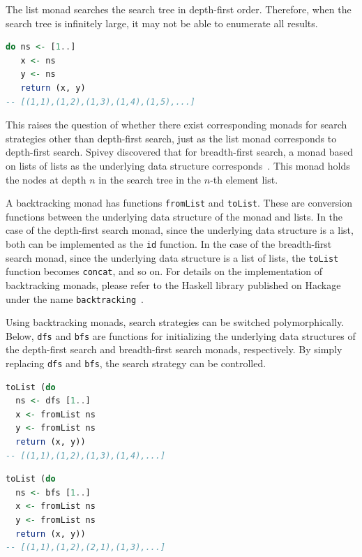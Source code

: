 The list monad searches the search tree in depth-first order.
Therefore, when the search tree is infinitely large, it may not be able to enumerate all results.
\begin{lstlisting}[language=haskell,numbers=none]
do ns <- [1..]
   x <- ns
   y <- ns
   return (x, y)
-- [(1,1),(1,2),(1,3),(1,4),(1,5),...]
\end{lstlisting}

This raises the question of whether there exist corresponding monads for search strategies other than depth-first search, just as the list monad corresponds to depth-first search.
Spivey discovered that for breadth-first search, a monad based on lists of lists as the underlying data structure corresponds~\cite{spivey2009algebras}.
This monad holds the nodes at depth $n$ in the search tree in the $n$-th element list.

A backtracking monad has functions \lstinline{fromList} and \lstinline{toList}.
These are conversion functions between the underlying data structure of the monad and lists.
In the case of the depth-first search monad, since the underlying data structure is a list, both can be implemented as the \lstinline{id} function.
In the case of the breadth-first search monad, since the underlying data structure is a list of lists, the \lstinline{toList} function becomes \lstinline{concat}, and so on.
For details on the implementation of backtracking monads, please refer to the Haskell library published on Hackage under the name \texttt{backtracking}~\cite{backtrackingGitHub}.

Using backtracking monads, search strategies can be switched polymorphically.
Below, \lstinline{dfs} and \lstinline{bfs} are functions for initializing the underlying data structures of the depth-first search and breadth-first search monads, respectively.
By simply replacing \lstinline{dfs} and \lstinline{bfs}, the search strategy can be controlled.
\begin{lstlisting}[language=haskell,numbers=none]
toList (do
  ns <- dfs [1..]
  x <- fromList ns
  y <- fromList ns
  return (x, y))
-- [(1,1),(1,2),(1,3),(1,4),...]
\end{lstlisting}
\begin{lstlisting}[language=haskell,numbers=none]
toList (do
  ns <- bfs [1..]
  x <- fromList ns
  y <- fromList ns
  return (x, y))
-- [(1,1),(1,2),(2,1),(1,3),...]
\end{lstlisting}


